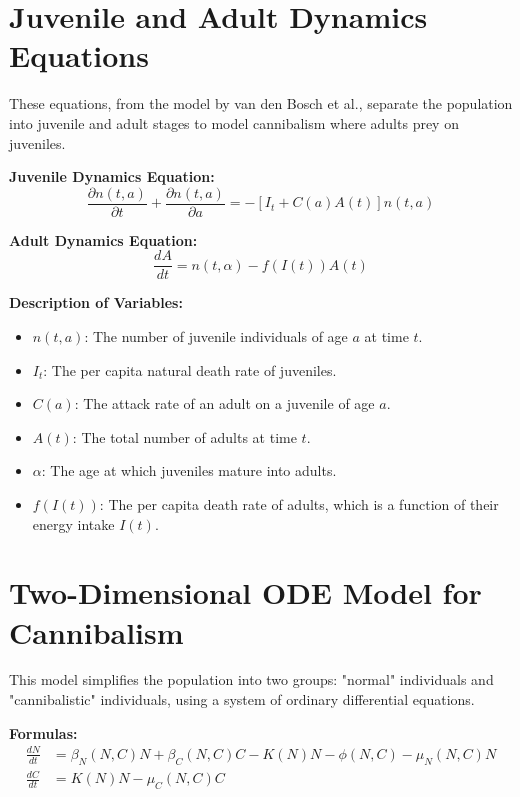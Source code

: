 \documentclass[12pt]{article}
\begin{document}
\section{Juvenile and Adult Dynamics Equations}

These equations, from the model by van den Bosch et al., separate the population into juvenile and adult stages to model cannibalism where adults prey on juveniles.

\textbf{Juvenile Dynamics Equation:}
\begin{equation}
\frac{\partial n(t, a)}{\partial t} + \frac{\partial n(t, a)}{\partial a} = -[I_t + C(a)A(t)]n(t, a)
\end{equation}

\textbf{Adult Dynamics Equation:}
\begin{equation}
\frac{dA}{dt} = n(t, \alpha) - f(I(t))A(t)
\end{equation}

\textbf{Description of Variables:}
\begin{itemize}
    \item \(n(t, a)\): The number of juvenile individuals of age \(a\) at time \(t\).
    \item \(I_t\): The per capita natural death rate of juveniles.
    \item \(C(a)\): The attack rate of an adult on a juvenile of age \(a\).
    \item \(A(t)\): The total number of adults at time \(t\).
    \item \(\alpha\): The age at which juveniles mature into adults.
    \item \(f(I(t))\): The per capita death rate of adults, which is a function of their energy intake \(I(t)\).
\end{itemize}

\section{Two-Dimensional ODE Model for Cannibalism}

This model simplifies the population into two groups: "normal" individuals and "cannibalistic" individuals, using a system of ordinary differential equations.

\textbf{Formulas:}
\begin{align}
\frac{dN}{dt} &= \beta_N(N, C)N + \beta_C(N, C)C - K(N)N - \phi(N, C) - \mu_N(N, C)N \\
\frac{dC}{dt} &= K(N)N - \mu_C(N, C)C
\end{align}
\end{document}
